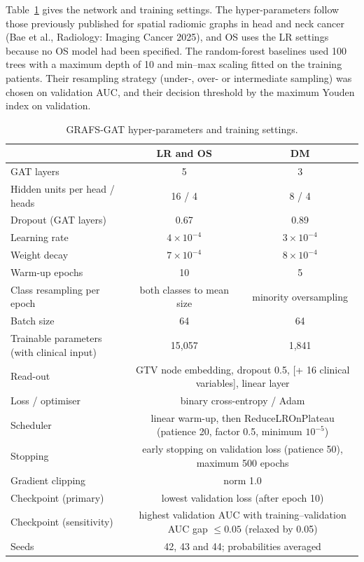 \documentclass[11pt]{article}
\providecommand{\botrule}{\bottomrule}
\newcommand{\method}{GRAFS-GAT}  %
\begin{document}
Table~\ref{tab:gat} gives the network and training settings. The hyper-parameters follow those previously published for spatial radiomic graphs in head and neck cancer (Bae et al., Radiology: Imaging Cancer 2025), and OS uses the LR settings because no OS model had been specified. The random-forest baselines used 100 trees with a maximum depth of 10 and min--max scaling fitted on the training patients. Their resampling strategy (under-, over- or intermediate sampling) was chosen on validation AUC, and their decision threshold by the maximum Youden index on validation.

\begin{table}[!htb]
\centering\small
\caption{\method{} hyper-parameters and training settings.}\label{tab:gat}
\begin{tabular}{@{}lcc@{}}
\toprule
 & LR and OS & DM \\
\midrule
GAT layers & 5 & 3 \\
Hidden units per head / heads & 16 / 4 & 8 / 4 \\
Dropout (GAT layers) & 0.67 & 0.89 \\
Learning rate & $4\times10^{-4}$ & $3\times10^{-4}$ \\
Weight decay & $7\times10^{-4}$ & $8\times10^{-4}$ \\
Warm-up epochs & 10 & 5 \\
Class resampling per epoch & both classes to mean size & minority oversampling \\
Batch size & 64 & 64 \\
Trainable parameters (with clinical input) & 15,057 & 1,841 \\
\midrule
Read-out & \multicolumn{2}{c}{GTV node embedding, dropout 0.5, [+ 16 clinical variables], linear layer} \\
Loss / optimiser & \multicolumn{2}{c}{binary cross-entropy / Adam} \\
Scheduler & \multicolumn{2}{c}{linear warm-up, then ReduceLROnPlateau (patience 20, factor 0.5, minimum $10^{-5}$)} \\
Stopping & \multicolumn{2}{c}{early stopping on validation loss (patience 50), maximum 500 epochs} \\
Gradient clipping & \multicolumn{2}{c}{norm 1.0} \\
Checkpoint (primary) & \multicolumn{2}{c}{lowest validation loss (after epoch 10)} \\
Checkpoint (sensitivity) & \multicolumn{2}{c}{highest validation AUC with training--validation AUC gap $\le 0.05$ (relaxed by 0.05)} \\
Seeds & \multicolumn{2}{c}{42, 43 and 44; probabilities averaged} \\
\botrule
\end{tabular}
\end{table}
\end{document}
